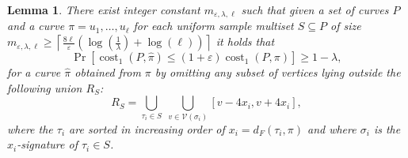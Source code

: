 \documentclass[11pt, letter]{article}
\DeclareMathOperator{\cost}{cost}
\newtheorem{lemma}[theorem]{Lemma}
\newcommand{\lemlab}[1]{\label{lemma:#1}}
\providecommand{\eps}{{\varepsilon}}\newcommand{\Astop}{\overline{a}}
\providecommand{\ceil}[1]{\left\lceil {#1} \right\rceil}
\providecommand{\pth}[2][\!]{#1\left({#2}\right)}
\newcommand{\lenClusters}{\ensuremath{\ell}}
\newcommand{\trajectory}[2]{\ensuremath{{#1}_{#2}}}
\newcommand{\inputSym}{\ensuremath{\tau}}
\newcommand{\inputTraj}[1]{\trajectory{\inputSym}{#1}}
\newcommand{\VtxSet}{\ensuremath{\mathcal{V}}}
\newcommand{\distFr}[2]{\ensuremath{d_F\pth{#1,#2}}}
\begin{document}
\begin{lemma}\lemlab{omit:low:prob}
There exist integer constant $m_{\eps,\lambda,\lenClusters}$ such that given a
set of curves $P$  and a curve $\pi=u_1,\dots,u_{\lenClusters}$ for each uniform
sample multiset $S\subseteq P$ of size $m_{\eps,\lambda,\lenClusters} \ge \ceil{\frac{8\lenClusters}{\eps}
\left(\log\left(\frac{1}{\lambda}\right)+\log(\lenClusters)\right)}$
it holds that 
\[\Pr\left[ \cost_{1}(P,\widehat{\pi}) \leq (1+\eps)\cost_{1}(P,\pi) \right] \geq 1-\lambda,\] 
for a curve $\widehat{\pi}$ obtained from $\pi$ by omitting any subset of vertices lying outside 
the following union $R_S$:
\[
R_S = \bigcup_{ \inputTraj{i} \in S }\; \bigcup_{v \in \VtxSet(\sigma_i) } [v-4x_i,v+4x_i],
\]
where the $\tau_i$ are sorted in increasing order of $x_i=\distFr{\inputTraj{i}}{\pi}$ and where
$\sigma_i$ is the $x_i$-signature of $\inputTraj{i} \in S$.
\end{lemma}
\end{document}

